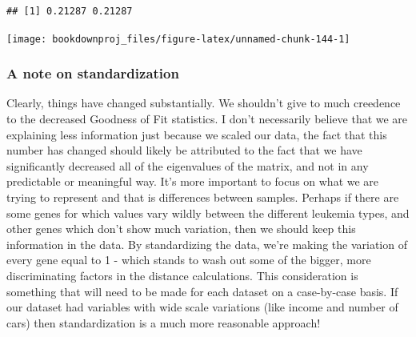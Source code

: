 \documentclass[
]{article}
\newenvironment{Shaded}{\begin{snugshade}}{\end{snugshade}}
\newcommand{\AttributeTok}[1]{\textcolor[rgb]{0.77,0.63,0.00}{#1}}
\newcommand{\CommentTok}[1]{\textcolor[rgb]{0.56,0.35,0.01}{\textit{#1}}}
\newcommand{\DecValTok}[1]{\textcolor[rgb]{0.00,0.00,0.81}{#1}}
\newcommand{\FunctionTok}[1]{\textcolor[rgb]{0.00,0.00,0.00}{#1}}
\newcommand{\NormalTok}[1]{#1}
\newcommand{\OtherTok}[1]{\textcolor[rgb]{0.56,0.35,0.01}{#1}}
\newcommand{\SpecialCharTok}[1]{\textcolor[rgb]{0.00,0.00,0.00}{#1}}
\newcommand{\StringTok}[1]{\textcolor[rgb]{0.31,0.60,0.02}{#1}}
\theoremstyle{definition}
\theoremstyle{definition}
\theoremstyle{definition}
\theoremstyle{definition}
\theoremstyle{remark}
\begin{document}
\begin{verbatim}
## [1] 0.21287 0.21287
\end{verbatim}

\begin{Shaded}
\end{Shaded}

\begin{center}\texttt{[image: bookdownproj\_files/figure-latex/unnamed-chunk-144-1]} \end{center}

\hypertarget{a-note-on-standardization}{%
\subsubsection*{A note on standardization}\label{a-note-on-standardization}}

Clearly, things have changed substantially. We shouldn't give to much creedence to the decreased Goodness of Fit statistics. I don't necessarily believe that we are explaining less information just because we scaled our data, the fact that this number has changed should likely be attributed to the fact that we have significantly decreased all of the eigenvalues of the matrix, and not in any predictable or meaningful way. It's more important to focus on what we are trying to represent and that is differences between samples. Perhaps if there are some genes for which values vary wildly between the different leukemia types, and other genes which don't show much variation, then we should keep this information in the data. By standardizing the data, we're making the variation of every gene equal to 1 - which stands to wash out some of the bigger, more discriminating factors in the distance calculations. This consideration is something that will need to be made for each dataset on a case-by-case basis. If our dataset had variables with wide scale variations (like income and number of cars) then standardization is a much more reasonable approach!
\end{document}
